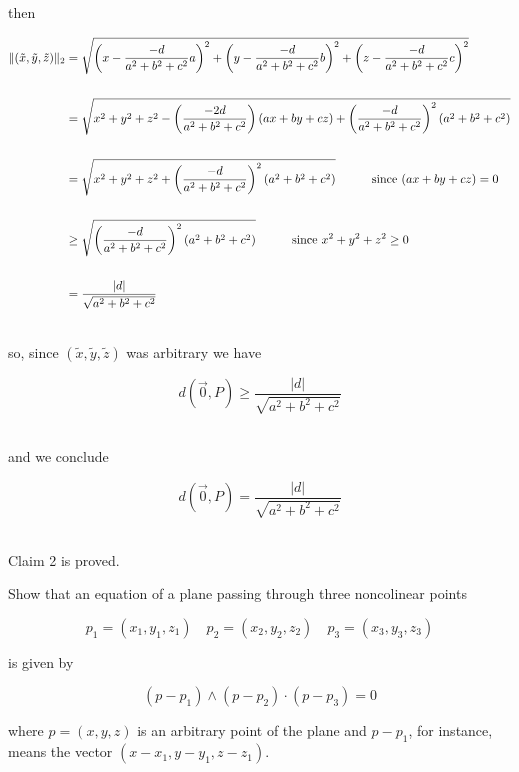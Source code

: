\documentclass[12pt,letterpaper]{hmcpset}
\begin{document}
\begin{solution}
then 


\begin{align}
\Vert  (\tilde{x},\tilde{y},\tilde{z}) \Vert_2 &= \sqrt{\left(x-\frac{-d}{a^2+b^2+c^2} a\right)^2+\left(y-\frac{-d}{a^2+b^2+c^2} b\right)^2+\left( z-\frac{-d}{a^2+b^2+c^2} c\right)^2} \notag\\
&\quad\notag\\
&=  \sqrt{x^2+y^2+z^2 -\left(\frac{-2d}{a^2+b^2+c^2}\right)(ax+by+cz)+ \left(\frac{-d}{a^2+b^2+c^2}\right)^2(a^2+b^2+c^2) }\notag\\
&\quad\notag\\
&=  \sqrt{x^2+y^2+z^2 + \left(\frac{-d}{a^2+b^2+c^2}\right)^2(a^2+b^2+c^2) } \quad\quad\quad \text{since}\  (ax+by+cz)=0 \notag\\
\quad\notag\\
&\geq \sqrt{ \left(\frac{-d}{a^2+b^2+c^2}\right)^2(a^2+b^2+c^2)} \quad\quad\quad \text{since}\  x^2+y^2+z^2\geq 0\notag\\
\quad\notag\\
&= \frac{\vert d\vert}{\sqrt{a^2+b^2+c^2}}\notag\\
\notag
\end{align}

so, since $(\tilde{x},\tilde{y},\tilde{z}) $ was arbitrary we have

\[ d(\vec0,P) \geq \frac{\vert d\vert}{\sqrt{a^2+b^2+c^2}} \]\

and we conclude

\[d(\vec0,P) = \frac{\vert d\vert}{\sqrt{a^2+b^2+c^2}}\]\

Claim 2 is proved.


\end{solution}

\newpage







\begin{problem}
Show that an equation of a plane passing through three noncolinear points 

\[p_1 = (x_1,y_1,z_1) \quad p_2 = (x_2,y_2,z_2) \quad  p_3 = (x_3,y_3,z_3)\]

is given by

\[ (p-p_1)\wedge(p-p_2)\cdot(p-p_3) =0 \]

where $p = (x,y,z)$ is an arbitrary point of the plane and $p-p_1$, for instance, means the vector $(x-x_1,y-y_1,z-z_1)$.
\end{problem}
\end{document}
